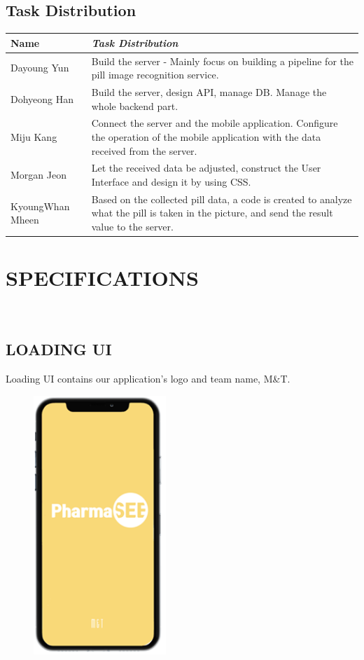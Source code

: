 \documentclass[conference]{IEEEtran}
\begin{document}
\subsection{Task Distribution}\label{AA}
\begin{table}[h!]
\begin{center}
\begin{tabular}{|p{}|p{}|}
\cline{1-2} 
\textbf{Name} & \textbf{\textit{Task Distribution}} \\
\hline
Dayoung Yun&Build the server - Mainly focus on building a pipeline for the pill image recognition service.\\
\hline
Dohyeong Han&Build the server, design API, manage DB. Manage the whole backend part.\\
\hline
Miju Kang&Connect the server and the mobile application. Configure the operation of the mobile application with the data received from the server.\\
\hline
Morgan Jeon&Let the received data be adjusted, construct the User Interface and design it by using CSS.\\
\hline
KyoungWhan Mheen&Based on the collected pill data, a code is created to analyze what the pill is taken in the picture, and send the result value to the server.\\
\hline
\end{tabular}
\label{tab1}
\end{center}
\end{table}


\section{SPECIFICATIONS}\\

\subsection{LOADING UI}Loading UI contains our application’s logo and team name, M&T. \\
\begin{figure}[h!]
\centering
\includegraphics[width=5cm]{imagefolder/loadingui.png}
\caption{}
\label{fig:map}
\end{figure}
\end{document}
